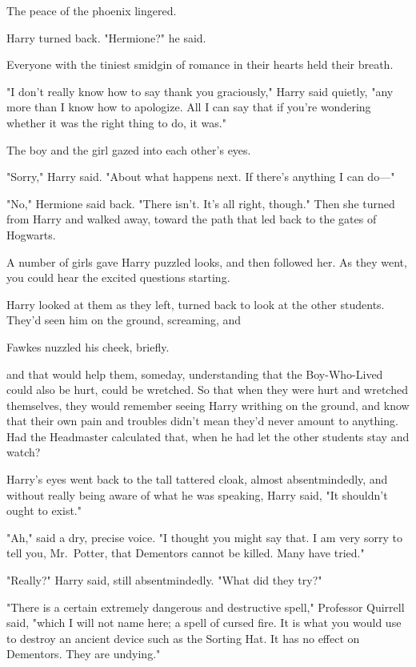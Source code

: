 The peace of the phoenix lingered.

Harry turned back. "Hermione?" he said.

Everyone with the tiniest smidgin of romance in their hearts held their breath.

"I don't really know how to say thank you graciously," Harry said quietly, "any
more than I know how to apologize. All I can say that if you're wondering
whether it was the right thing to do, it was."

The boy and the girl gazed into each other's eyes.

"Sorry," Harry said. "About what happens next. If there's anything I can do—"

"No," Hermione said back. "There isn't. It's all right, though." Then she
turned from Harry and walked away, toward the path that led back to the gates
of Hogwarts.

A number of girls gave Harry puzzled looks, and then followed her. As they
went, you could hear the excited questions starting.

Harry looked at them as they left, turned back to look at the other students.
They'd seen him on the ground, screaming, and{\el}

Fawkes nuzzled his cheek, briefly.

{\el} and that would help them, someday, understanding that the Boy-Who-Lived
could also be hurt, could be wretched. So that when they were hurt and wretched
themselves, they would remember seeing Harry writhing on the ground, and know
that their own pain and troubles didn't mean they'd never amount to anything.
Had the Headmaster calculated that, when he had let the other students stay and
watch?

Harry's eyes went back to the tall tattered cloak, almost absentmindedly, and
without really being aware of what he was speaking, Harry said, "It shouldn't
ought to exist."

"Ah," said a dry, precise voice. "I thought you might say that. I am very sorry
to tell you, Mr.~Potter, that Dementors cannot be killed. Many have tried."

"Really?" Harry said, still absentmindedly. "What did they try?"

"There is a certain extremely dangerous and destructive spell," Professor
Quirrell said, "which I will not name here; a spell of cursed fire. It is what
you would use to destroy an ancient device such as the Sorting Hat. It has no
effect on Dementors. They are undying."


